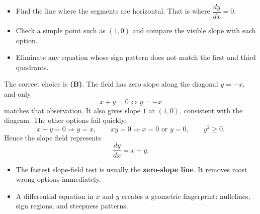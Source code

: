 \begin{hint}
\begin{itemize}[leftmargin=*]
    \item Find the line where the segments are horizontal. That is where $\dfrac{dy}{dx}=0$.
    \item Check a simple point such as $(1,0)$ and compare the visible slope with each option.
    \item Eliminate any equation whose sign pattern does not match the first and third quadrants.
\end{itemize}
\end{hint}

\begin{solution}
The correct choice is \textbf{(B)}. The field has zero slope along the diagonal $y=-x$, and only
\[
x+y=0 \iff y=-x
\]
matches that observation. It also gives slope $1$ at $(1,0)$, consistent with the diagram. The other options fail quickly:
\[
x-y=0 \Rightarrow y=x,\qquad xy=0 \Rightarrow x=0 \text{ or } y=0,\qquad y^2\ge 0.
\]
Hence the slope field represents
\[
\boxed{\frac{dy}{dx}=x+y.}
\]
\end{solution}

\begin{takeaways}
\begin{itemize}[leftmargin=*]
    \item The fastest slope-field test is usually the \textbf{zero-slope line}. It removes most wrong options immediately.
    \item A differential equation in $x$ and $y$ creates a geometric fingerprint: nullclines, sign regions, and steepness patterns.
\end{itemize}
\end{takeaways}

